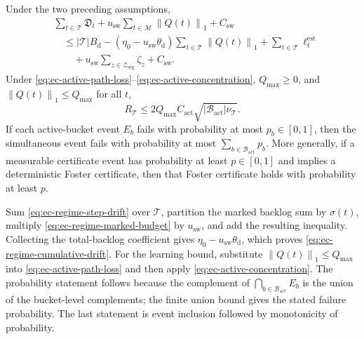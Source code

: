 \documentclass[opre,dblanonrev]{informs4}
\newcommand{\normone}[1]{\left\|#1\right\|_1}
\begin{document}
\begin{proposition}
\label{prop:ec-conditional-extensions}
Under the two preceding assumptions,
\begin{equation}
  \begin{aligned}
  &\sum_{t\in\mathcal T}\mathfrak D_t
   +u_{\mathrm{sw}}\sum_{t\in\mathcal M}\normone{Q(t)}
   +C_{\mathrm{sw}}\\
  &\quad\le
   |\mathcal T|B_{\mathrm d}
   -(\eta_0-u_{\mathrm{sw}}\theta_{\mathrm d})
     \sum_{t\in\mathcal T}\normone{Q(t)}
   +\sum_{t\in\mathcal T}\ell_t^{\mathrm{est}}\\
  &\qquad{}
   +u_{\mathrm{sw}}\sum_{z\in\mathcal Z_{\mathrm{seg}}}\zeta_z
   +C_{\mathrm{sw}}.
  \end{aligned}
  \label{eq:ec-regime-cumulative-drift}
\end{equation}
Under \eqref{eq:ec-active-path-loss}--\eqref{eq:ec-active-concentration},
\(Q_{\max}\ge0\), and \(\normone{Q(t)}\le Q_{\max}\) for all \(t\),
\begin{equation}
  R_{\mathcal T}
  \le 2Q_{\max}C_{\mathrm{act}}
    \sqrt{|\mathcal B_{\mathrm{act}}|\nu_{\mathcal T}}.
  \label{eq:ec-active-bucket-regret}
\end{equation}
If each active-bucket event \(E_b\) fails with probability at most
\(p_b\in[0,1]\), then the simultaneous event fails with probability at most
\(\sum_{b\in\mathcal B_{\mathrm{act}}}p_b\).  More generally, if a measurable
certificate event has probability at least \(p\in[0,1]\) and implies a deterministic
Foster certificate, then that Foster certificate holds with probability at
least \(p\).
\end{proposition}

Sum \eqref{eq:ec-regime-step-drift} over \(\mathcal T\), partition the marked
backlog sum by \(\sigma(t)\), multiply
\eqref{eq:ec-regime-marked-budget} by \(u_{\mathrm{sw}}\), and add the resulting
inequality.  Collecting the total-backlog coefficient gives
\(\eta_0-u_{\mathrm{sw}}\theta_{\mathrm d}\), which proves
\eqref{eq:ec-regime-cumulative-drift}.  For the learning bound, substitute
\(\normone{Q(t)}\le Q_{\max}\) into
\eqref{eq:ec-active-path-loss} and then apply
\eqref{eq:ec-active-concentration}.  The probability statement follows because
the complement of \(\bigcap_{b\in\mathcal B_{\mathrm{act}}}E_b\) is the union
of the bucket-level complements; the finite union bound gives the stated
failure probability.  The last statement is event inclusion followed by
monotonicity of probability.
\endproof
\end{document}
